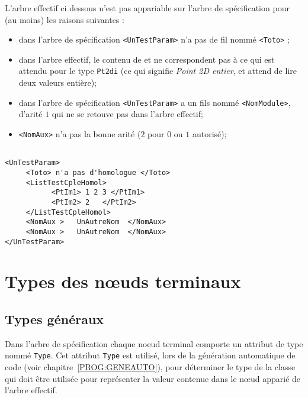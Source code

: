  

L'arbre effectif ci dessous n'est pas  appariable
sur l'arbre de sp\'ecification pour (au moins) les
raisons suivantes :

\begin{itemize}
   \item dans l'arbre de sp\'ecification {\tt <UnTestParam>} 
         n'a pas de fil nomm\'e {\tt  <Toto>} ;
   \item dans l'arbre effectif, le contenu de {\tt <PtIm1>} et
         {\tt <PtIm2>}  ne correspondent pas \`a ce qui est attendu pour
         le type {\tt Pt2di} (ce qui signifie \emph{Point 2D entier},
         et attend de lire deux valeurs enti\`ere);
    \item dans l'arbre de sp\'ecification {\tt <UnTestParam>}
          a un fils nomm\'e  {\tt  <NomModule>}, d'arit\'e $1$ qui
          ne se retouve pas dans l'arbre effectif;
    \item  {\tt <NomAux>} n'a pas la bonne arit\'e ($2$ pour 
           $0$ ou $1$ autoris\'e);
\end{itemize}

\begin{verbatim}

<UnTestParam>
     <Toto> n'a pas d'homologue </Toto>
     <ListTestCpleHomol>
           <PtIm1> 1 2 3 </PtIm1>
           <PtIm2> 2   </PtIm2>
     </ListTestCpleHomol>
     <NomAux >   UnAutreNom  </NomAux>
     <NomAux >   UnAutreNom  </NomAux>
</UnTestParam>

\end{verbatim}


\section{Types des n\oe{}uds terminaux}

\subsection{Types g\'en\'eraux}

Dans l'arbre de sp\'ecification chaque noeud terminal comporte un attribut
de type nomm\'e {\tt Type}. Cet attribut {\tt Type} est utilis\'e, lors de la g\'en\'eration
automatique de code (voir chapitre~\ref{PROG:GENEAUTO}), pour
d\'eterminer le type de la classe  \CPP qui doit \^etre utilis\'ee
pour repr\'esenter la valeur contenue dans le n\oe{}ud appari\'e de 
l'arbre effectif.


